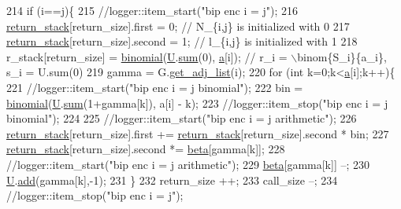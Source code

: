 \begin{DoxyCode}
214     \textcolor{keywordflow}{if} (i==j)\{
215       \textcolor{comment}{//logger::item\_start("bip enc i = j");}
216       \hyperlink{namespacehelper__vars_a6d2100c373830cacd232319a9958652d}{return\_stack}[return\_size].first = 0; \textcolor{comment}{// N\_\{i,j\} is initialized with 0}
217       \hyperlink{namespacehelper__vars_a6d2100c373830cacd232319a9958652d}{return\_stack}[return\_size].second = 1; \textcolor{comment}{// l\_\{i,j\} is initialized with 1}
218       r\_stack[return\_size] = \hyperlink{compression__helper_8cpp_acecca9cb279d3b3d82915a07d67818cf}{binomial}(\hyperlink{classb__graph__encoder_ac810138443002a2b2cf579ced2dc34ce}{U}.\hyperlink{classreverse__fenwick__tree_a672731fd6395b4853430073a099a80e6}{sum}(0), \hyperlink{classb__graph__encoder_afd22d167f495cd85b41397f337c377c2}{a}[i]); \textcolor{comment}{// r\_i = \(\backslash\)binom\{S\_i\}\{a\_i\}, s\_i =
       U.sum(0)}
219       gamma = G.\hyperlink{classb__graph_aa81c7179b9c6cb4986c4b41e84a85799}{get\_adj\_list}(i);
220       \textcolor{keywordflow}{for} (\textcolor{keywordtype}{int} k=0;k<\hyperlink{classb__graph__encoder_afd22d167f495cd85b41397f337c377c2}{a}[i];k++)\{
221         \textcolor{comment}{//logger::item\_start("bip enc i = j binomial");}
222         bin = \hyperlink{compression__helper_8cpp_acecca9cb279d3b3d82915a07d67818cf}{binomial}(\hyperlink{classb__graph__encoder_ac810138443002a2b2cf579ced2dc34ce}{U}.\hyperlink{classreverse__fenwick__tree_a672731fd6395b4853430073a099a80e6}{sum}(1+gamma[k]), a[i] - k);
223         \textcolor{comment}{//logger::item\_stop("bip enc i = j binomial");}
224 
225         \textcolor{comment}{//logger::item\_start("bip enc i = j arithmetic");}
226         \hyperlink{namespacehelper__vars_a6d2100c373830cacd232319a9958652d}{return\_stack}[return\_size].first += \hyperlink{namespacehelper__vars_a6d2100c373830cacd232319a9958652d}{return\_stack}[return\_size].second * bin;
227         \hyperlink{namespacehelper__vars_a6d2100c373830cacd232319a9958652d}{return\_stack}[return\_size].second *= \hyperlink{classb__graph__encoder_ae54d76cc4cee399d98951f870897a144}{beta}[gamma[k]];
228         \textcolor{comment}{//logger::item\_start("bip enc i = j arithmetic");}
229         \hyperlink{classb__graph__encoder_ae54d76cc4cee399d98951f870897a144}{beta}[gamma[k]] --;
230         \hyperlink{classb__graph__encoder_ac810138443002a2b2cf579ced2dc34ce}{U}.\hyperlink{classreverse__fenwick__tree_a942d7f49b37e53ebfec3076d177691d7}{add}(gamma[k],-1);
231       \}
232       return\_size ++;
233       call\_size --;
234       \textcolor{comment}{//logger::item\_stop("bip enc i = j");}

\end{DoxyCode}
